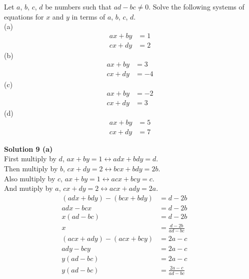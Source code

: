 \documentclass[6pt]{article}
\begin{document}
\begin{tcolorbox}[title=Problem 9, breakable]
    Let $a$, $b$, $c$, $d$ be numbers such that $ad - bc \not = 0$. Solve 
    the following systems of equations for $x$ and $y$ in terms of 
    $a$, $b$, $c$, $d$. \\
    (a) \begin{align*}
            ax + by &= 1 \\
            cx + dy &= 2
        \end{align*}
    (b) \begin{align*}
            ax + by &= 3 \\
            cx + dy &= -4
        \end{align*}
    (c) \begin{align*}
            ax + by &= -2 \\
            cx + dy &= 3 
        \end{align*}
    (d) \begin{align*}
            ax + by &= 5 \\
            cx + dy &= 7
        \end{align*}
\end{tcolorbox}

\textbf{Solution 9 (a)} \\
First multiply by $d$, $ax + by = 1 \leftrightarrow adx + bdy = d$. \\
Then multiply by $b$, $cx + dy = 2 \leftrightarrow bcx + bdy = 2b$. \\
Also multiply by $c$, $ax + by = 1 \leftrightarrow acx + bcy = c$. \\
And mutiply by $a$, $cx + dy  = 2 \leftrightarrow acx + ady = 2a$. 
\begin{align*}
    (adx + bdy) - (bcx + bdy) &= d - 2b && \\
    adx - bcx &= d - 2b && \\
    x(ad - bc) &= d - 2b && \\
    x &= \frac{d - 2b}{ad - bc}
\end{align*}
\begin{align*}
    (acx + ady) - (acx + bcy) &= 2a - c && \\
    ady - bcy &= 2a - c && \\
    y(ad - bc) &= 2a - c && \\
    y(ad - bc) &= \frac{2a - c}{ad - bc} 
\end{align*}
\end{document}
